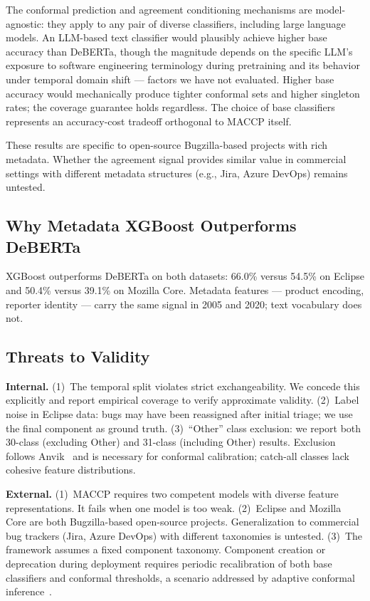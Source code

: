 \documentclass[conference]{IEEEtran}
\begin{document}
The conformal prediction and agreement conditioning mechanisms are model-agnostic: they apply to any pair of diverse classifiers, including large language models. An LLM-based text classifier would plausibly achieve higher base accuracy than DeBERTa, though the magnitude depends on the specific LLM's exposure to software engineering terminology during pretraining and its behavior under temporal domain shift --- factors we have not evaluated. Higher base accuracy would mechanically produce tighter conformal sets and higher singleton rates; the coverage guarantee holds regardless. The choice of base classifiers represents an accuracy-cost tradeoff orthogonal to MACCP itself.

These results are specific to open-source Bugzilla-based projects with rich metadata. Whether the agreement signal provides similar value in commercial settings with different metadata structures (e.g., Jira, Azure DevOps) remains untested.

\subsection{Why Metadata XGBoost Outperforms DeBERTa}

XGBoost outperforms DeBERTa on both datasets: 66.0\% versus 54.5\% on Eclipse and 50.4\% versus 39.1\% on Mozilla Core. Metadata features --- product encoding, reporter identity --- carry the same signal in 2005 and 2020; text vocabulary does not.

\subsection{Threats to Validity}

\textbf{Internal.}
(1)~The temporal split violates strict exchangeability. We concede this explicitly and report empirical coverage to verify approximate validity.
(2)~Label noise in Eclipse data: bugs may have been reassigned after initial triage; we use the final component as ground truth.
(3)~``Other'' class exclusion: we report both 30-class (excluding Other) and 31-class (including Other) results. Exclusion follows Anvik~\cite{anvik2006should} and is necessary for conformal calibration; catch-all classes lack cohesive feature distributions.

\textbf{External.}
(1)~MACCP requires two competent models with diverse feature representations. It fails when one model is too weak.
(2)~Eclipse and Mozilla Core are both Bugzilla-based open-source projects. Generalization to commercial bug trackers (Jira, Azure DevOps) with different taxonomies is untested.
(3)~The framework assumes a fixed component taxonomy. Component creation or deprecation during deployment requires periodic recalibration of both base classifiers and conformal thresholds, a scenario addressed by adaptive conformal inference~\cite{gibbs2021adaptive}.
\end{document}
